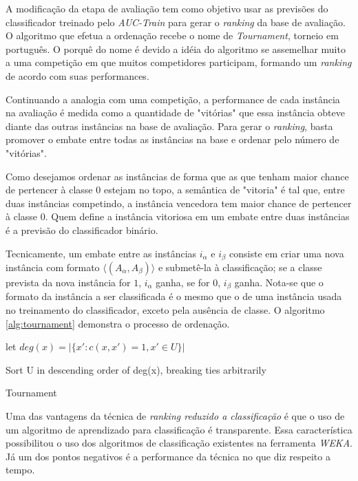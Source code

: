 A modificação da etapa de avaliação tem como objetivo usar as previsões do classificador treinado pelo \emph{AUC-Train} para gerar o \emph{ranking} da base de avaliação. O algoritmo que efetua a ordenação recebe o nome de \emph{Tournament}, torneio em português. O porquê do nome é devido a idéia do algoritmo se assemelhar muito a uma competição em que muitos competidores participam, formando um \emph{ranking} de acordo com suas performances.

Continuando a analogia com uma competição, a performance de cada instância na avaliação é medida como a quantidade de "vitórias" que essa instância obteve diante das outras instâncias na base de avaliação. Para gerar o \emph{ranking}, basta promover o embate entre todas as instâncias na base e ordenar pelo número de "vitórias".

Como desejamos ordenar as instâncias de forma que as que tenham maior chance de pertencer à classe $0$ estejam no topo, a semântica de "vitoria" é tal que, entre duas instâncias competindo, a instância vencedora tem maior chance de pertencer à classe $0$. Quem define a instância vitoriosa em um embate entre duas instâncias é a previsão do classificador binário.

Tecnicamente, um embate entre as instâncias $i_\alpha$ e $i_\beta$ consiste em criar uma nova instância com formato $\langle (A_\alpha, A_\beta)\rangle$ e submetê-la à classificação; se a classe prevista da nova instância for $1$, $i_\alpha$ ganha, se for $0$, $i_\beta$ ganha. Nota-se que o formato da instância a ser classificada é o mesmo que o de uma instância usada no treinamento do classificador, exceto pela ausência de classe. O algoritmo \ref{alg:tournament} demonstra o processo de ordenação.

\begin{algorithm}
    \begin{algorithmic}

            \STATE let $deg(x) = |\{x':c(x, x') = 1, x' \in U\}|$
        \ENDFOR

        \STATE Sort U in descending order of deg(x), breaking ties arbitrarily

        \caption{Tournament}
        \label{alg:tournament}

    \end{algorithmic}
\end{algorithm}

Uma das vantagens da técnica de \emph{ranking reduzido a classificação} é que o uso de um algoritmo de aprendizado para classificação é transparente. Essa característica possibilitou o uso dos algoritmos de classificação existentes na ferramenta \emph{WEKA}. Já um dos pontos negativos é a performance da técnica no que diz respeito a tempo.

